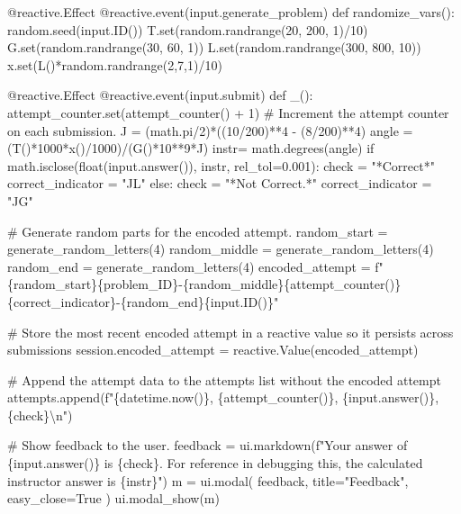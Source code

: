 \documentclass[
  letterpaper,
  DIV=11,
  numbers=noendperiod]{scrreprt}
\newenvironment{Shaded}{\begin{snugshade}}{\end{snugshade}}
\newcommand{\NormalTok}[1]{\textcolor[rgb]{0.00,0.23,0.31}{#1}}
\begin{document}
\begin{Shaded}
\begin{Highlighting}[]
\NormalTok{    @reactive.Effect}
\NormalTok{    @reactive.event(input.generate\_problem)}
\NormalTok{    def randomize\_vars():}
\NormalTok{        random.seed(input.ID())}
\NormalTok{        T.set(random.randrange(20, 200, 1)/10)}
\NormalTok{        G.set(random.randrange(30, 60, 1))}
\NormalTok{        L.set(random.randrange(300, 800, 10))}
\NormalTok{        x.set(L()*random.randrange(2,7,1)/10)}
        
        
        
\NormalTok{    @reactive.Effect}
\NormalTok{    @reactive.event(input.submit)}
\NormalTok{    def \_():}
\NormalTok{        attempt\_counter.set(attempt\_counter() + 1)  \# Increment the attempt counter on each submission.}
\NormalTok{        J = (math.pi/2)*((10/200)**4 {-} (8/200)**4)}
\NormalTok{        angle = (T()*1000*x()/1000)/(G()*10**9*J)}
\NormalTok{        instr= math.degrees(angle)}
\NormalTok{        if math.isclose(float(input.answer()), instr, rel\_tol=0.001):}
\NormalTok{            check = "*Correct*"}
\NormalTok{            correct\_indicator = "JL"}
\NormalTok{        else:}
\NormalTok{            check = "*Not Correct.*"}
\NormalTok{            correct\_indicator = "JG"}

\NormalTok{        \# Generate random parts for the encoded attempt.}
\NormalTok{        random\_start = generate\_random\_letters(4)}
\NormalTok{        random\_middle = generate\_random\_letters(4)}
\NormalTok{        random\_end = generate\_random\_letters(4)}
\NormalTok{        encoded\_attempt = f"\{random\_start\}\{problem\_ID\}{-}\{random\_middle\}\{attempt\_counter()\}\{correct\_indicator\}{-}\{random\_end\}\{input.ID()\}"}

\NormalTok{        \# Store the most recent encoded attempt in a reactive value so it persists across submissions}
\NormalTok{        session.encoded\_attempt = reactive.Value(encoded\_attempt)}

\NormalTok{        \# Append the attempt data to the attempts list without the encoded attempt}
\NormalTok{        attempts.append(f"\{datetime.now()\}, \{attempt\_counter()\}, \{input.answer()\}, \{check\}\textbackslash{}n")}

\NormalTok{        \# Show feedback to the user.}
\NormalTok{        feedback = ui.markdown(f"Your answer of \{input.answer()\} is \{check\}. For reference in debugging this, the calculated instructor answer is \{instr\}")}
\NormalTok{        m = ui.modal(}
\NormalTok{            feedback,}
\NormalTok{            title="Feedback",}
\NormalTok{            easy\_close=True}
\NormalTok{        )}
\NormalTok{        ui.modal\_show(m)}


\end{Highlighting}
\end{Shaded}
\end{document}
